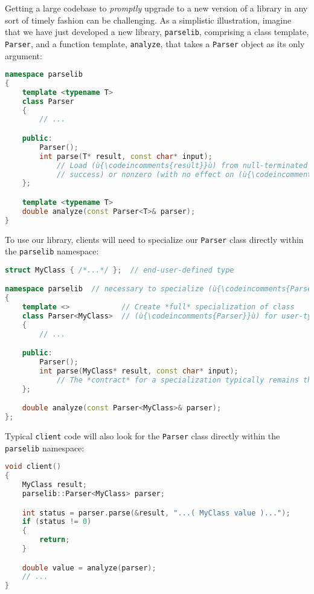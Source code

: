 Getting a large codebase to \emph{promptly} upgrade to a new version of
a library in any sort of timely fashion can be challenging. As a
simplistic illustration, imagine that we have just developed a new
library, \texttt{parselib}, comprising a class template, \texttt{Parser},
and a function template, \texttt{analyze}, that takes a \texttt{Parser}
object as its only argument:

\begin{lstlisting}[language=C++]
namespace parselib
{
    template <typename T>
    class Parser
    {
        // ...

    public:
        Parser();
        int parse(T* result, const char* input);
            // Load (ù{\codeincomments{result}}ù) from null-terminated (ù{\codeincomments{input}}ù); return (ù{\codeincomments{0}}ù) (on
            // success) or nonzero (with no effect on (ù{\codeincomments{result}}ù)).
    };

    template <typename T>
    double analyze(const Parser<T>& parser);
}
\end{lstlisting}
    
\noindent To use our library, clients will need to specialize our \texttt{Parser}
class directly within the \texttt{parselib} namespace:

\begin{lstlisting}[language=C++]
struct MyClass { /*...*/ };  // end-user-defined type

namespace parselib  // necessary to specialize (ù{\codeincomments{Parser}}ù)
{
    template <>            // Create *full* specialization of class
    class Parser<MyClass>  // (ù{\codeincomments{Parser}}ù) for user-type (ù{\codeincomments{MyClass}}ù).
    {
        // ...

    public:
        Parser();
        int parse(MyClass* result, const char* input);
            // The *contract* for a specialization typically remains the same.
    };

    double analyze(const Parser<MyClass>& parser);
};
\end{lstlisting}
    
\noindent Typical \texttt{client} code will also look for the \texttt{Parser}
class directly within the \texttt{parselib} namespace:

\begin{lstlisting}[language=C++]
void client()
{
    MyClass result;
    parselib::Parser<MyClass> parser;

    int status = parser.parse(&result, "...( MyClass value )...");
    if (status != 0)
    {
        return;
    }

    double value = analyze(parser);
    // ...
}
\end{lstlisting}
    
